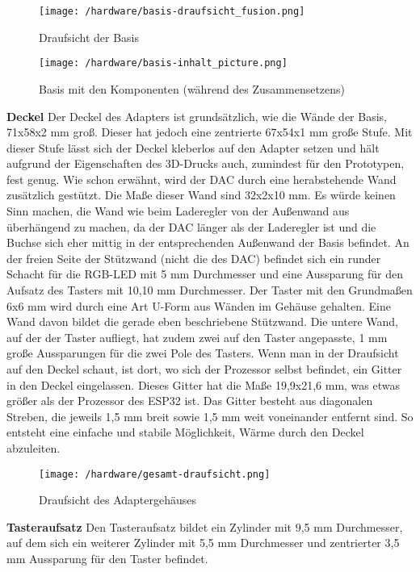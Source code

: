 \documentclass[11pt, twoside]{article}
\begin{document}
\parencite[vgl.][]{noauthor_urlnl17_nodate}\newline
\begin{figure}[H]
	\texttt{[image: /hardware/basis-draufsicht\_fusion.png]}
	\caption{Draufsicht der Basis}
\end{figure}
\begin{figure}[H]
	\texttt{[image: /hardware/basis-inhalt\_picture.png]}
	\caption{Basis mit den Komponenten (während des Zusammensetzens)}
\end{figure}
\noindent \textbf{Deckel} \newline
Der Deckel des Adapters ist grundsätzlich, wie die Wände der Basis, 71x58x2 mm groß. Dieser hat jedoch eine zentrierte 67x54x1 mm große Stufe. Mit dieser Stufe lässt sich der Deckel kleberlos auf den Adapter setzen und hält aufgrund der Eigenschaften des 3D-Drucks auch, zumindest für den Prototypen, fest genug.
Wie schon erwähnt, wird der DAC durch eine herabstehende Wand zusätzlich gestützt. Die Maße dieser Wand sind 32x2x10 mm. Es würde keinen Sinn machen, die Wand wie beim Laderegler von der Außenwand aus überhängend zu machen, da der DAC länger als der Laderegler ist und die Buchse sich eher mittig in der entsprechenden Außenwand der Basis befindet.\newline
An der freien Seite der Stützwand (nicht die des DAC) befindet sich ein runder Schacht für die RGB-LED mit 5 mm Durchmesser und eine Aussparung für den Aufsatz des Tasters mit 10,10 mm Durchmesser. Der Taster mit den Grundmaßen 6x6 mm wird durch eine Art U-Form aus Wänden im Gehäuse gehalten. Eine Wand davon bildet die gerade eben beschriebene Stützwand. Die untere Wand, auf der der Taster aufliegt, hat zudem zwei auf den Taster angepasste, 1 mm große Aussparungen für die zwei Pole des Tasters.\newline
Wenn man in der Draufsicht auf den Deckel schaut, ist dort, wo sich der Prozessor selbst befindet, ein Gitter in den Deckel eingelassen. Dieses Gitter hat die Maße 19,9x21,6 mm, was etwas größer als der Prozessor des ESP32 ist. Das Gitter besteht aus diagonalen Streben, die jeweils 1,5 mm breit sowie 1,5 mm weit voneinander entfernt sind. So entsteht eine einfache und stabile Möglichkeit, Wärme durch den Deckel abzuleiten.\newline
\begin{figure}[H]
	\texttt{[image: /hardware/gesamt-draufsicht.png]}
	\caption{Draufsicht des Adaptergehäuses}
\end{figure}
\noindent \textbf{Tasteraufsatz} \newline
Den Tasteraufsatz bildet ein Zylinder mit 9,5 mm Durchmesser, auf dem sich ein weiterer Zylinder mit 5,5 mm Durchmesser und zentrierter 3,5 mm Aussparung für den Taster befindet.\newline
\end{document}
